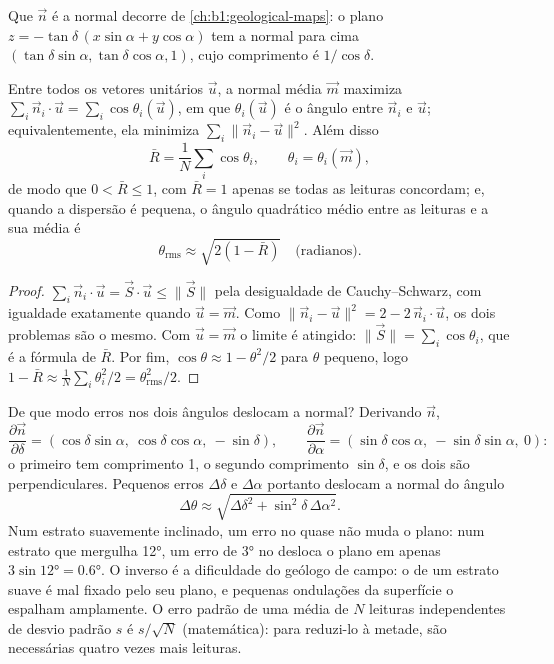 Que $\vec n$ é a normal decorre de \cref{ch:b1:geological-maps}: o plano $z = -\tan\delta\,(x\sin\alpha + y\cos\alpha)$ tem a normal para cima $(\tan\delta\sin\alpha, \tan\delta\cos\alpha, 1)$, cujo comprimento é $1/\cos\delta$.

\begin{proposition}\label{prop:b1:field-lab-methods-1:vector-mean}
Entre todos os vetores unitários $\vec u$, a normal média $\vec m$ maximiza
$\sum_i \vec n_i\cdot\vec u = \sum_i \cos\theta_i(\vec u)$, em que
$\theta_i(\vec u)$ é o ângulo entre $\vec n_i$ e $\vec u$; equivalentemente, ela minimiza $\sum_i \|\vec n_i - \vec u\|^2$. Além disso
\[
  \bar R = \frac1N\sum_i \cos\theta_i, \qquad \theta_i = \theta_i(\vec m),
\]
de modo que $0 < \bar R \le 1$, com $\bar R = 1$ apenas se todas as leituras concordam; e, quando a dispersão é pequena, o ângulo quadrático médio entre as leituras e a sua média é
\[
  \theta_{\text{rms}} \approx \sqrt{2(1 - \bar R)} \quad\text{(radianos)}.
\]
\end{proposition}

\begin{proof}
$\sum_i \vec n_i\cdot\vec u = \vec S\cdot\vec u \le \|\vec S\|$ pela desigualdade de Cauchy--Schwarz, com igualdade exatamente quando $\vec u = \vec m$. Como $\|\vec n_i - \vec u\|^2 = 2 - 2\,\vec n_i\cdot\vec u$, os dois problemas são o mesmo. Com $\vec u = \vec m$ o limite é atingido:
$\|\vec S\| = \sum_i\cos\theta_i$, que é a fórmula de $\bar R$. Por fim, $\cos\theta \approx 1 - \theta^2/2$ para $\theta$ pequeno, logo $1 - \bar R \approx
\frac1N\sum_i\theta_i^2/2 = \theta_{\text{rms}}^2/2$.
\end{proof}

De que modo erros nos dois ângulos deslocam a normal? Derivando $\vec n$,
\[
  \frac{\partial\vec n}{\partial\delta} = (\cos\delta\sin\alpha,\ \cos\delta\cos\alpha,\ -\sin\delta),
  \qquad
  \frac{\partial\vec n}{\partial\alpha} = (\sin\delta\cos\alpha,\ -\sin\delta\sin\alpha,\ 0):
\]
o primeiro tem comprimento 1, o segundo comprimento $\sin\delta$, e os dois são perpendiculares. Pequenos erros $\Delta\delta$ e $\Delta\alpha$ portanto deslocam a normal do ângulo
\[
  \Delta\theta \approx \sqrt{\Delta\delta^2 + \sin^2\delta\,\Delta\alpha^2}.
\]
Num estrato suavemente inclinado, um erro no  quase não muda o plano: num estrato que mergulha \ang{12}, um erro de \ang{3} no  desloca o plano em apenas $3\sin\ang{12} = \ang{0.6}$. O inverso é a dificuldade do geólogo de campo: o  de um estrato suave é mal fixado pelo seu plano, e pequenas ondulações da superfície o espalham amplamente. O erro padrão de uma média de $N$ leituras independentes de desvio padrão $s$ é $s/\sqrt N$ (matemática): para reduzi-lo à metade, são necessárias quatro vezes mais leituras.

